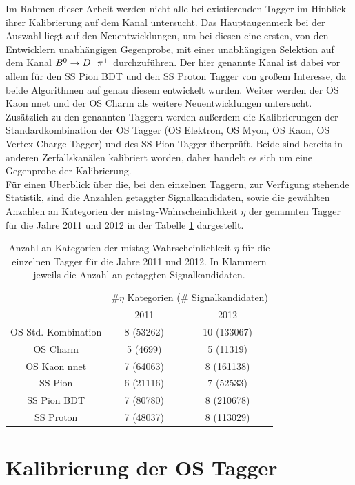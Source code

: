 Im Rahmen dieser Arbeit werden nicht alle bei \lhcb existierenden Tagger im Hinblick ihrer Kalibrierung auf dem Kanal \BdToDpi untersucht. Das Hauptaugenmerk bei der Auswahl liegt auf den Neuentwicklungen, um bei diesen eine ersten, von den Entwicklern unabhängigen Gegenprobe, mit einer unabhängigen Selektion auf dem Kanal ${{B}^0}\rightarrow D^-\pi^+$ durchzuführen. Der hier genannte Kanal ist dabei vor allem für den SS Pion BDT und den SS Proton Tagger von großem Interesse, da beide Algorithmen auf genau diesem entwickelt wurden. Weiter werden der OS Kaon nnet  und der OS Charm als weitere Neuentwicklungen untersucht. Zusätzlich zu den genannten Taggern werden außerdem die Kalibrierungen der Standardkombination der OS Tagger (OS Elektron, OS Myon, OS Kaon, OS Vertex Charge Tagger) und des SS Pion Tagger überprüft. Beide sind bereits in anderen Zerfallskanälen kalibriert worden, daher handelt es sich um eine Gegenprobe der Kalibrierung.\\
Für einen Überblick über die, bei den einzelnen Taggern, zur Verfügung stehende Statistik, sind die Anzahlen getaggter Signalkandidaten, sowie die gewählten Anzahlen an Kategorien der mistag-Wahrscheinlichkeit $\eta$ der genannten Tagger für die Jahre \num{2011} und \num{2012} in der Tabelle \ref{tab:anzahlen} dargestellt.
\begin{table}[htbp]
	\centering
	\caption{Anzahl an Kategorien der mistag-Wahrscheinlichkeit $\eta$ für die einzelnen Tagger für die Jahre \num{2011} und \num{2012}. In Klammern jeweils die Anzahl an getaggten Signalkandidaten.}
	\label{tab:anzahlen}
	\begin{tabular}{c|cc}
	\toprule
	& \multicolumn{2}{c}{$\#\eta$ Kategorien ($\#$ Signalkandidaten)}  \\
    	& 2011  & 2012 \\ 
	\midrule
  OS Std.-Kombination & 8 (53262) & 10 (133067)  \\
  OS Charm            & 5 (4699) & 5 (11319)  \\
  OS Kaon nnet        & 7 (64063) & 8 (161138)  \\
  SS Pion             & 6 (21116) & 7 (52533)  \\
  SS Pion BDT         & 7 (80780) & 8 (210678)  \\
  SS Proton           & 7 (48037) & 8 (113029)  \\ 
  \bottomrule
	\end{tabular}
\end{table}

\section{Kalibrierung der OS Tagger}


